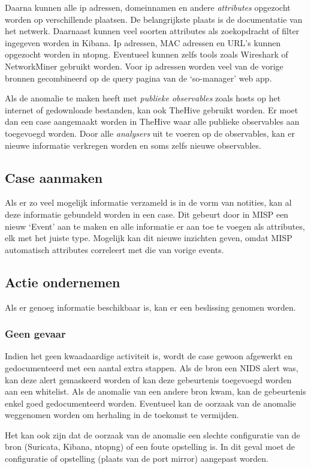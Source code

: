 \documentclass[a4paper, 12pt]{report}
\begin{document}
Daarna kunnen alle ip adressen, domeinnamen en andere \emph{attributes} opgezocht worden op verschillende plaatsen.
De belangrijkste plaats is de documentatie van het netwerk.
Daarnaast kunnen veel soorten attributes als zoekopdracht of filter ingegeven worden in Kibana.
Ip adressen, MAC adressen en URL's kunnen opgezocht worden in ntopng.
Eventueel kunnen zelfs tools zoals Wireshark of NetworkMiner gebruikt worden.
Voor ip adressen worden veel van de vorige bronnen gecombineerd op de query pagina van de `so-manager' web app.

Als de anomalie te maken heeft met \emph{publieke observables} zoals hosts op het internet of gedownloade bestanden, kan ook TheHive gebruikt worden.
Er moet dan een case aangemaakt worden in TheHive waar alle publieke observables aan toegevoegd worden.
Door alle \emph{analysers} uit te voeren op de observables, kan er nieuwe informatie verkregen worden en soms zelfs nieuwe observables.

\subsection{Case aanmaken}
Als er zo veel mogelijk informatie verzameld is in de vorm van notities, kan al deze informatie gebundeld worden in een case.
Dit gebeurt door in MISP een nieuw `Event' aan te maken en alle informatie er aan toe te voegen als attributes, elk met het juiste type.
Mogelijk kan dit nieuwe inzichten geven, omdat MISP automatisch attributes correleert met die van vorige events.

\subsection{Actie ondernemen}
Als er genoeg informatie beschikbaar is, kan er een beslissing genomen worden.

\subsubsection{Geen gevaar}
Indien het geen kwaadaardige activiteit is, wordt de case gewoon afgewerkt en gedocumenteerd met een aantal extra stappen.
Als de bron een NIDS alert was, kan deze alert gemaskeerd worden of kan deze gebeurtenis toegevoegd worden aan een whitelist.
Als de anomalie van een andere bron kwam, kan de gebeurtenis enkel goed gedocumenteerd worden.
Eventueel kan de oorzaak van de anomalie weggenomen worden om herhaling in de toekomst te vermijden.

Het kan ook zijn dat de oorzaak van de anomalie een slechte configuratie van de bron (Suricata, Kibana, ntopng) of een foute opstelling is.
In dit geval moet de configuratie of opstelling (plaats van de port mirror) aangepast worden.
\end{document}

